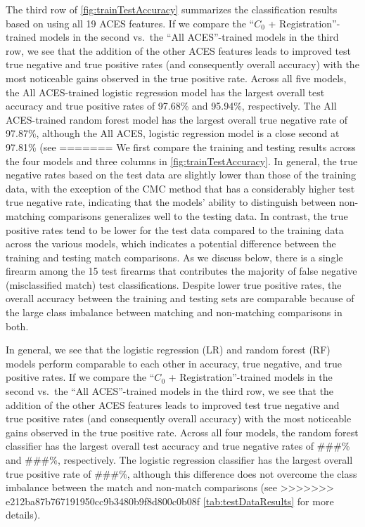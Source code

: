 \documentclass[reprint]{JASA}
\begin{document}
The third row of \autoref{fig:trainTestAccuracy} summarizes the
classification results based on using all 19 ACES features. If we
compare the ``\(C_0\) + Registration''-trained models in the second
vs.~the ``All ACES''-trained models in the third row, we see that the
addition of the other ACES features leads to improved test true negative
and true positive rates (and consequently overall accuracy) with the
most noticeable gains observed in the true positive rate. Across all
five models, the All ACES-trained logistic regression model has the
largest overall test accuracy and true positive rates of 97.68\% and
95.94\%, respectively. The All ACES-trained random forest model has the
largest overall true negative rate of 97.87\%, although the All ACES,
logistic regression model is a close second at 97.81\% (see
=======
We first compare the training and testing results across the four models
and three columns in \autoref{fig:trainTestAccuracy}. In general, the
true negative rates based on the test data are slightly lower than those
of the training data, with the exception of the CMC method that has a
considerably higher test true negative rate, indicating that the models'
ability to distinguish between non-matching comparisons generalizes well
to the testing data. In contrast, the true positive rates tend to be
lower for the test data compared to the training data across the various
models, which indicates a potential difference between the training and
testing match comparisons. As we discuss below, there is a single
firearm among the 15 test firearms that contributes the majority of
false negative (misclassified match) test classifications. Despite lower
true positive rates, the overall accuracy between the training and
testing sets are comparable because of the large class imbalance between
matching and non-matching comparisons in both.

In general, we see that the logistic regression (LR) and random forest
(RF) models perform comparable to each other in accuracy, true negative,
and true positive rates. If we compare the ``\(C_0\) +
Registration''-trained models in the second vs.~the ``All ACES''-trained
models in the third row, we see that the addition of the other ACES
features leads to improved test true negative and true positive rates
(and consequently overall accuracy) with the most noticeable gains
observed in the true positive rate. Across all four models, the random
forest classifier has the largest overall test accuracy and true
negative rates of \#\#\#\% and \#\#\#\%, respectively. The logistic
regression classifier has the largest overall true positive rate of
\#\#\#\%, although this difference does not overcome the class imbalance
between the match and non-match comparisons (see
>>>>>>> e212ba87b767191950cc9b3480b9f8d800c0b08f
\autoref{tab:testDataResults} for more details).
\end{document}
